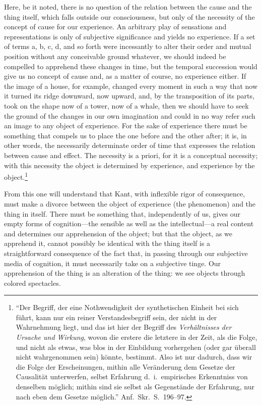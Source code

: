 \documentclass[12pt]{article}
\begin{document}
Here, be it noted, there is no question of the relation between the cause
and the thing itself, which falls outside our consciousness, but only of
the necessity of the concept of cause for our experience. An arbitrary
play of sensations and representations is only of subjective significance
and yields no experience. If a set of terms a, b, c, d, and so forth were
incessantly to alter their order and mutual position without any
conceivable ground whatever, we should indeed be compelled to apprehend
these changes in time, but the temporal succession would give us no
concept of cause and, as a matter of course, no experience either. If the
image of a house, for example, changed every moment in such a way that now
it turned its ridge downward, now upward, and, by the transposition of its
parts, took on the shape now of a tower, now of a whale, then we should
have to seek the ground of the changes in our own imagination and could in
no way refer such an image to any object of experience. For the sake of
experience there must be something that
compels us to place the one before and the other after; it is, in other
words, the necessarily determinate order of time that expresses the
relation between cause and effect. The necessity is a priori, for it is a
conceptual necessity; with this necessity the object is determined by
experience, and experience by the object.\footnote{``Der Begriff, der eine
Nothwendigkeit der synthetischen Einheit bei sich führt, kann nur ein
reiner Verstandesbegriff sein, der nicht in der Wahrnehmung liegt, und das
ist hier der Begriff des \emph{Verhältnisses der Ursache und Wirkung},
wovon die erstere die letztere in der Zeit, als die Folge, und nicht als
etwas, was blos in der Einbildung vorhergehen (oder gar überall nicht
wahrgenommen sein) könnte, bestimmt. Also ist nur dadurch, dass wir die
Folge der Erscheinungen, mithin alle Veränderung dem Gesetze der
Causalität unterwerfen, selbst Erfahrung d.\ i.\ empirisches Erkenntniss
von denselben möglich; mithin sind sie selbst als Gegenstände der
Erfahrung, nur nach eben dem Gesetze möglich.'' Anf.\ Skr.\ S.~196--97.}

From this one will understand that Kant, with inflexible rigor of
consequence, must make a divorce between the object of experience (the
phenomenon) and the thing in itself. There must be something that,
independently of us, gives our empty forms of cognition—the sensible as
well as the intellectual—a real content and determines our apprehension of
the object; but that the object, as we apprehend it, cannot possibly be
identical with the thing itself is a straightforward consequence of the
fact that, in passing through our subjective media of cognition, it must
necessarily take on a subjective tinge. Our apprehension of the thing is
an alteration of the thing: we see objects through colored spectacles.
\end{document}
